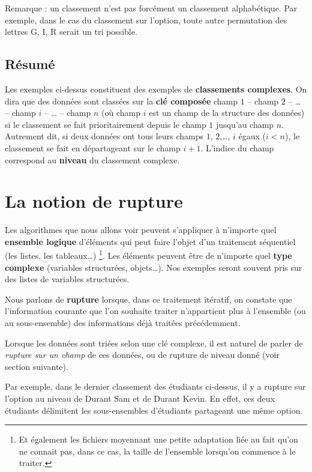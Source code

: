 	Remarque : un classement n’est pas forcément un classement alphabétique.
        Par exemple, dans le cas du classement sur l'option, toute autre
        permutation des lettres G, I, R serait un tri possible.

\subsection*{Résumé}
	Les exemples ci-dessus constituent des exemples de \textbf{classements complexes}. 
	On dira que des données sont classées sur la \textbf{clé composée} 
	champ $1$ – champ $2$ – \dots{} – champ $i$ – \dots{} – champ $n$ 
	(où \og{}champ $i$\fg{} est un champ de la structure des données) 
	si le classement se fait prioritairement depuis le champ $1$ jusqu’au champ $n$. 
	Autrement dit, si deux données ont tous leurs champs $1$, $2$,\dots, $i$ égaux ($i<n$), 
	le classement se fait en départageant sur le champ $i+1$. 
	L’indice du champ correspond au \textbf{niveau} du classement complexe.

\section{La notion de rupture}

	Les algorithmes que nous allons voir 
	peuvent s'appliquer à n'importe quel \textbf{ensemble logique} d'éléments
	qui peut faire l'objet d'un traitement séquentiel
	(les listes, les tableaux\dots)%
	\footnote{%
		Et également les fichiers moyennant une petite adaptation
		liée au fait qu'on ne connait pas, dans ce cas, 
		la taille de l'ensemble lorsqu'on commence à le traiter.
	}. 
	Les éléments peuvent être de n'importe quel \textbf{type complexe} 
	(variables structurées, objets\dots).
	Nos exemples seront souvent pris sur des listes de variables structurées. 
		
	Nous parlons de \textbf{rupture} lorsque, dans ce traitement itératif, 
	on constate que l’information courante que l’on souhaite traiter
	n’appartient plus à l’ensemble (ou au sous-ensemble) 
	des informations déjà traitées précédemment.
	
	Lorsque les données sont triées selon une clé complexe, il est naturel
        de parler de \textit{rupture sur un champ} de ces données, ou de rupture
        de niveau donné (voir section suivante).
	
	Par exemple, dans le dernier classement des étudiants ci-dessus, il y a
	rupture sur l’option au niveau de Durant Sam et de Durant Kevin. En
	effet, ces deux étudiants délimitent les sous-ensembles d’étudiants
	partageant une même option.
	
